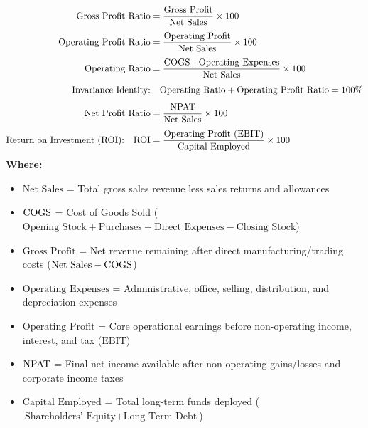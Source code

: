 \begin{formulabox}
\begin{align*}
    \text{Gross Profit Ratio} &= \frac{\text{Gross Profit}}{\text{Net Sales}} \times 100 \\[4pt]
    \text{Operating Profit Ratio} &= \frac{\text{Operating Profit}}{\text{Net Sales}} \times 100 \\[4pt]
    \text{Operating Ratio} &= \frac{\operatorname{COGS} + \text{Operating Expenses}}{\text{Net Sales}} \times 100 \\[4pt]
    \text{Invariance Identity:} &\quad \text{Operating Ratio} + \text{Operating Profit Ratio} = 100\% \\[4pt]
    \text{Net Profit Ratio} &= \frac{\operatorname{NPAT}}{\text{Net Sales}} \times 100 \\[4pt]
    \text{Return on Investment (ROI):} \quad \text{ROI} &= \frac{\text{Operating Profit (EBIT)}}{\text{Capital Employed}} \times 100
\end{align*}
\textbf{Where:}
\begin{itemize}[noitemsep, topsep=2pt]
    \item $\text{Net Sales}$ = Total gross sales revenue less sales returns and allowances
    \item $\operatorname{COGS}$ = Cost of Goods Sold ($\text{Opening Stock} + \text{Purchases} + \text{Direct Expenses} - \text{Closing Stock}$)
    \item $\text{Gross Profit}$ = Net revenue remaining after direct manufacturing/trading costs ($\text{Net Sales} - \operatorname{COGS}$)
    \item $\text{Operating Expenses}$ = Administrative, office, selling, distribution, and depreciation expenses
    \item $\text{Operating Profit}$ = Core operational earnings before non-operating income, interest, and tax ($\text{EBIT}$)
    \item $\operatorname{NPAT}$ = Final net income available after non-operating gains/losses and corporate income taxes
    \item $\text{Capital Employed}$ = Total long-term funds deployed ($\text{Shareholders' Equity} + \text{Long-Term Debt}$)
\end{itemize}
\end{formulabox}

